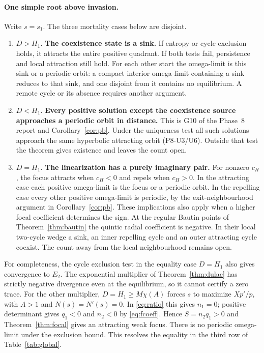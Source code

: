 \documentclass[12pt,a4paper,twoside,fleqn]{article}
\theoremstyle{journal}
\newcommand{\claim}[1]{{\normalfont\bfseries\boldmath #1}}
\begin{document}
\paragraph{One simple root above invasion.}
Write \(s=s_1\). The three mortality cases below are disjoint.
\begin{enumerate}
\item \(D>H_1\). \claim{The coexistence state is a sink.} If entropy or cycle exclusion holds, it attracts the entire positive quadrant. If both tests fail, persistence and local attraction still hold. For each other start the omega-limit is this sink or a periodic orbit: a compact interior omega-limit containing a sink reduces to that sink, and one disjoint from it contains no equilibrium. A remote cycle or its absence requires another argument.
\item \(D<H_1\). \claim{Every positive solution except the coexistence source approaches a periodic orbit in distance.} This is G10 of the Phase~8 report and Corollary~\ref{cor:pb}. Under the uniqueness test all such solutions approach the same hyperbolic attracting orbit (P8-U3/U6). Outside that test the theorem gives existence and leaves the count open.
\item \(D=H_1\). \claim{The linearization has a purely imaginary pair.} For nonzero \(c_H\), the focus attracts when \(c_H<0\) and repels when \(c_H>0\). In the attracting case each positive omega-limit is the focus or a periodic orbit. In the repelling case every other positive omega-limit is periodic, by the exit-neighbourhood argument in Corollary~\ref{cor:pb}. These implications also apply when a higher focal coefficient determines the sign. At the regular Bautin points of Theorem~\ref{thm:bautin} the quintic radial coefficient is negative. In their local two-cycle wedge a sink, an inner repelling cycle and an outer attracting cycle coexist. The count away from the local neighbourhood remains open.
\end{enumerate}
For completeness, the cycle exclusion test in the equality case \(D=H_1\) also gives convergence to \(E_2\). The exponential multiplier of Theorem~\ref{thm:dulac} has strictly negative divergence even at the equilibrium, so it cannot certify a zero trace. For the other multiplier, \(D=H_1\ge M\chi(A)\) forces \(s\) to maximize \(Xp'/p\), with \(A>1\) and \(N(s)=N'(s)=0\). In \eqref{eq:ratio} this gives \(n_1=0\); positive determinant gives \(q_1<0\) and \(n_2<0\) by \eqref{eq:fcoeff}. Hence \(S=n_2q_1>0\) and Theorem~\ref{thm:focal} gives an attracting weak focus. There is no periodic omega-limit under the exclusion bound. This resolves the equality in the third row of Table~\ref{tab:global}.
\end{document}
